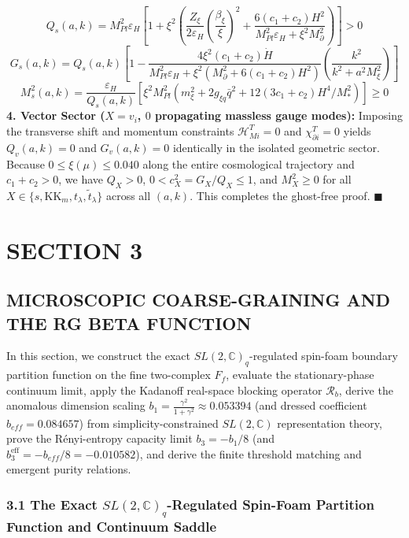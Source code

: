 \documentclass[aps,prd,onecolumn,superscriptaddress,nofootinbib,longbibliography,10pt]{revtex4-2}
\begin{document}
  \[ Q_s(a,k) = M_{Pl}^2 \varepsilon_H \left[ 1 + \xi^2\left( \frac{Z_\xi}{2\varepsilon_H}\left(\frac{\beta_\xi}{\xi}\right)^2 + \frac{6(c_1 + c_2)H^2}{M_{Pl}^2 \varepsilon_H + \xi^2 M_\partial^2} \right) \right] > 0 \]
  \[ G_s(a,k) = Q_s(a,k)\left[ 1 - \frac{4\xi^2(c_1 + c_2)\dot{H}}{M_{Pl}^2\varepsilon_H + \xi^2(M_\partial^2 + 6(c_1 + c_2)H^2)}\left(\frac{k^2}{k^2 + a^2 M_\xi^2}\right) \right] \]
  \[ M_s^2(a,k) = \frac{\varepsilon_H}{Q_s(a,k)}\left[ \xi^2 M_{Pl}^2\left(m_\xi^2 + 2g_{\xi q}\bar{q}^2 + 12(3c_1 + c_2)H^4/M_*^2\right) \right] \ge 0 \]
  \textbf{4. Vector Sector (\(X = v_i\), \(0\) propagating massless gauge modes):} Imposing the transverse shift and momentum constraints \(\mathcal{H}_{Mi}^T = 0\) and \(\chi_{\partial i}^T = 0\) yields \(Q_v(a,k) = 0\) and \(G_v(a,k) = 0\) identically in the isolated geometric sector. Because \(0 \le \xi(\mu) \le 0.040\) along the entire cosmological trajectory and \(c_1 + c_2 > 0\), we have \(Q_X > 0\), \(0 < c_X^2 = G_X/Q_X \le 1\), and \(M_X^2 \ge 0\) for all \(X \in \{s, \text{KK}_m, t_\lambda, \tilde{t}_\lambda\}\) across all \((a,k)\). This completes the ghost-free proof. \(\blacksquare\)




 

  
\section*{SECTION 3}

  
\subsection*{MICROSCOPIC COARSE-GRAINING AND THE RG BETA FUNCTION}

  In this section, we construct the exact \(SL(2,\mathbb{C})_q\)-regulated spin-foam boundary partition function on the fine two-complex \(F_f\), evaluate the stationary-phase continuum limit, apply the Kadanoff real-space blocking operator \(\mathcal{R}_b\), derive the anomalous dimension scaling \(b_1 = \frac{\gamma^2}{1+\gamma^2} \approx 0.053394\) (and dressed coefficient \(b_{eff} = 0.084657\)) from simplicity-constrained \(SL(2,\mathbb{C})\) representation theory, prove the Rényi-entropy capacity limit \(b_3 = -b_1/8\) (and \(b_3^{\text{eff}} = -b_{eff}/8 = -0.010582\)), and derive the finite threshold matching and emergent purity relations.


  
  
\subsubsection*{3.1 The Exact \(SL(2,\mathbb{C})_q\)-Regulated Spin-Foam Partition Function and Continuum Saddle}
\end{document}
